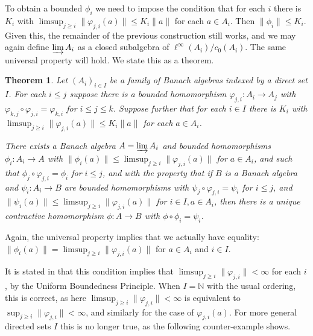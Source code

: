 \documentclass[a4paper,11pt]{article}
\newcommand{\indlim}{\varinjlim}
\newtheorem{theorem}[lemma]{Theorem}
\theoremstyle{definition}
\begin{document}
To obtain a bounded $\phi_i$ we need to impose the condition that for each $i$ there is $K_i$ with
$\limsup_{j\geq i} \|\varphi_{j,i}(a)\| \leq K_i\|a\|$ for each $a\in A_i$.  Then $\|\phi_i\| \leq
K_i$.  Given this, the remainder of the previous construction still works, and we may again define
$\indlim A_i$ as a closed subalgebra of $\ell^\infty(A_i) / c_0(A_i)$.  The same universal property
will hold.  We state this as a theorem.

\begin{theorem}\label{thm:2}
Let $(A_i)_{i\in I}$ be a family of Banach algebras indexed by a direct set $I$.  For each
$i\leq j$ suppose there is a bounded homomorphism $\varphi_{j,i}:A_i\rightarrow A_j$ with
$\varphi_{k,j} \circ \varphi_{j,i} = \varphi_{k,i}$ for $i\leq j\leq k$.  Suppose further that for
each $i\in I$ there is $K_i$ with $\limsup_{j\geq i} \|\varphi_{j,i}(a)\| \leq K_i \|a\|$ for each
$a\in A_i$.

There exists a Banach algebra $A=\indlim A_i$ and bounded homomorphisms $\phi_i:A_i\rightarrow
A$ with $\|\phi_i(a)\| \leq \limsup_{j\geq i} \|\varphi_{j,i}(a)\|$ for $a\in A_i$, and such that
$\phi_j \circ \varphi_{j,i} = \phi_i$ for $i\leq j$,
and with the property that if $B$ is a Banach algebra and
$\psi_i:A_i\rightarrow B$ are bounded homomorphisms with $\psi_j \circ \varphi_{j,i} = \psi_i$ for
$i\leq j$, and
$\|\psi_i(a)\| \leq \limsup_{j\geq i} \|\varphi_{j,i}(a)\|$ for $i\in I, a\in A_i$, then there is
a unique contractive homomorphism $\phi:A\rightarrow B$ with $\phi\circ\phi_i = \psi_i$.
\end{theorem}

Again, the universal property implies that we actually have equality: $\|\phi_i(a)\| =
\limsup_{j\geq i} \|\varphi_{j,i}(a)\|$ for $a\in A_i$ and $i\in I$.

It is stated in \cite{blackadar, palmer} that this condition implies that  $\limsup_{j\geq i}
\|\varphi_{j,i}\| < \infty$ for each $i$, by the Uniform Boundedness Principle.  When $I=\mathbb N$
with the usual ordering, this is correct, as here $\limsup_{j\geq i} \|\varphi_{j,i}\| < \infty$
is equivalent to $\sup_{j\geq i} \|\varphi_{j,i}\| < \infty$, and similarly for the case of
$\varphi_{j,i}(a)$.  For more general directed sets $I$ this is no longer true, as the following
counter-example shows.
\end{document}
